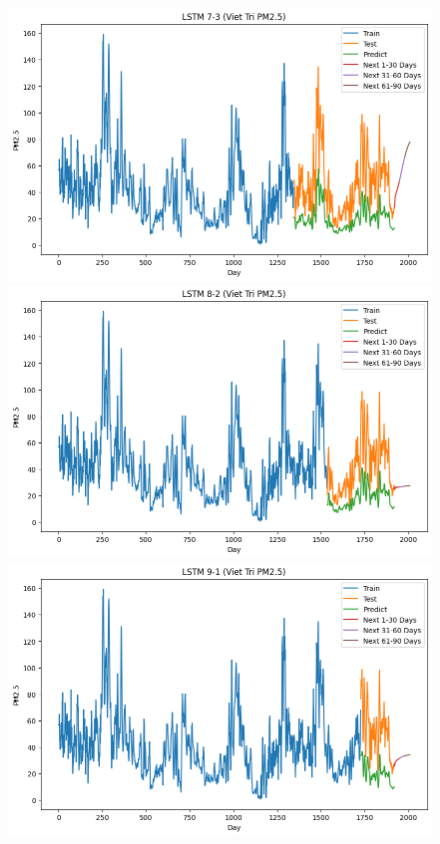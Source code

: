 \begin{figure}[H]
{\begin{adjustbox}{minipage=0.48\textwidth}
\begin{minipage}{0.3\textwidth}
            \end{minipage}\hfill
            \begin{minipage}{0.3\textwidth}
                \centering
                \includegraphics[width=\textwidth]{img/final/LSTM/90D/LSTM_7_3_VT.png}\\
                \includegraphics[width=\textwidth]{img/final/LSTM/90D/LSTM_8_2_VT.png}\\
                \includegraphics[width=\textwidth]{img/final/LSTM/90D/LSTM_9_1_VT.png}

\end{minipage}
\end{adjustbox}}
\end{figure}
